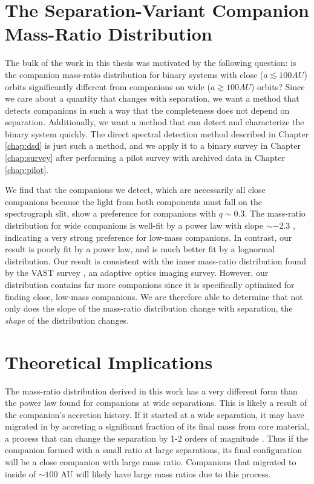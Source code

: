 \documentclass{utthesis}
\begin{document}
\section{The Separation-Variant Companion Mass-Ratio Distribution}

The bulk of the work in this thesis was motivated by the following question: is the companion mass-ratio distribution for binary systems with close ($a \lesssim 100 AU$) orbits significantly different from companions on wide ($a \gtrsim 100 AU$) orbits? Since we care about a quantity that changes with separation, we want a method that detects companions in such a way that the completeness does not depend on separation. Additionally, we want a method that can detect and characterize the binary system quickly. The direct spectral detection method described in Chapter \ref{chap:dsd} is just such a method, and we apply it to a binary survey in Chapter \ref{chap:survey} after performing a pilot survey with archived data in Chapter \ref{chap:pilot}.

We find that the companions we detect, which are necessarily all close companions because the light from both components must fall on the spectrograph slit, show a preference for companions with $q \sim 0.3$. The mass-ratio distribution for wide companions is well-fit by a power law with slope $\sim -2.3$ \citep{DeRosa2014}, indicating a very strong preference for low-mass companions. In contrast, our result is poorly fit by a power law, and is much better fit by a lognormal distribution. Our result is consistent with the inner mass-ratio distribution found by the VAST survey \citep{DeRosa2014}, an adaptive optics imaging survey. However, our distribution contains far more companions since it is specifically optimized for finding close, low-mass companions. We are therefore able to determine that not only does the slope of the mass-ratio distribution change with separation, the \emph{shape} of the distribution changes.

\section{Theoretical Implications}

The mass-ratio distribution derived in this work has a very different form than the power law found for companions at wide separations. This is likely a result of the companion's accretion history. If it started at a wide separation, it may have migrated in by accreting a significant fraction of its final mass from core material, a process that can change the separation by 1-2 orders of magnitude \citep{Bate2000}. Thus if the companion formed with a small ratio at large separations, its final configuration will be a close companion with large mass ratio. Companions that migrated to inside of $\sim 100$ AU will likely have large mass ratios due to this process.
\end{document}
